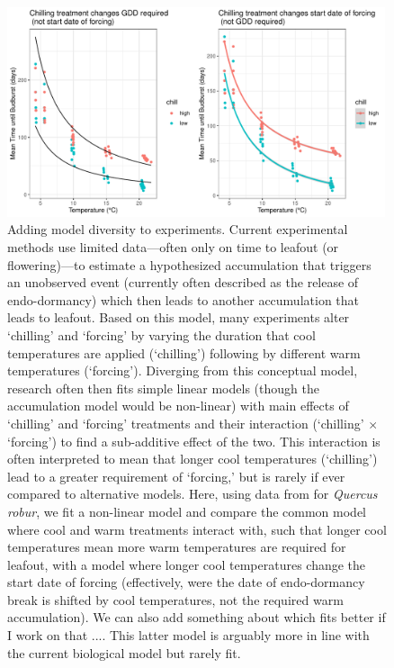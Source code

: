 \documentclass[11pt]{article}
\begin{document}
\begin{figure}[h!]
\includegraphics[width=0.99\textwidth]{..//figures/quickcompare.pdf}
\caption{Adding model diversity to experiments. Current experimental methods use limited data---often only on time to leafout (or flowering)---to estimate a hypothesized accumulation that triggers an unobserved event (currently often described as the release of endo-dormancy) which then leads to another accumulation that leads to leafout. Based on this model, many experiments alter `chilling' and `forcing' by varying the duration that cool temperatures are applied (`chilling') following by different warm temperatures (`forcing'). Diverging from this conceptual model, research often then fits simple linear models (though the accumulation model would be non-linear) with main effects of `chilling' and `forcing' treatments and their interaction (`chilling' $\times$ `forcing') to find a sub-additive effect of the two. This interaction is often interpreted to mean that longer cool temperatures (`chilling') lead to a greater requirement of `forcing,' but is rarely if ever compared to alternative models. Here, using data from \citet{walde2022higher} for \emph{Quercus robur}, we fit a non-linear model and compare the common model where cool and warm treatments interact with, such that longer cool temperatures mean more warm temperatures are required for leafout, with a model where longer cool temperatures change the start date of forcing (effectively, were the date of endo-dormancy break is shifted by cool temperatures, not the required warm accumulation). We can also add something about which fits better if I work on that .... This latter model is arguably more in line with the current biological model but rarely fit.} 
\label{fig:multimodelexps}
\end{figure}
\end{document}
